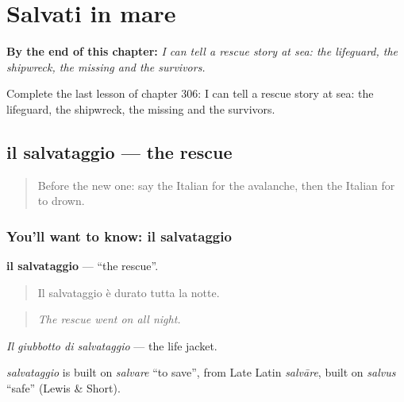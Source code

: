 
\chapter{Salvati in mare}
\label{ch:it-salvati-in-mare}

\begin{chapteropening}
\textbf{By the end of this chapter:} \emph{I can tell a rescue story at sea: the lifeguard, the shipwreck, the missing and the survivors.}

Complete the last lesson of chapter 306: I can tell a rescue story at sea: the lifeguard, the shipwreck, the missing and the survivors.
\end{chapteropening}

\section[il salvataggio]{il salvataggio — the rescue}

\label{lesson:IT-C306-salvataggio}



\begin{quote}
Before the new one: say the Italian for the avalanche, then the Italian for to drown.
\end{quote}

\subsection*{You'll want to know: il salvataggio}
\textbf{il salvataggio} — \textquotedblleft{}the rescue\textquotedblright{}.

\begin{quote}
Il salvataggio è durato tutta la notte.
\end{quote}

\begin{quote}
\emph{The rescue went on all night.}
\end{quote}

\emph{Il giubbotto di salvataggio} — the life jacket.

\begin{cousinweb}
\emph{salvataggio} is built on \emph{salvare} \textquotedblleft{}to save\textquotedblright{}, from Late Latin \emph{salvāre}, built on \emph{salvus} \textquotedblleft{}safe\textquotedblright{} (Lewis \& Short).
\end{cousinweb}

